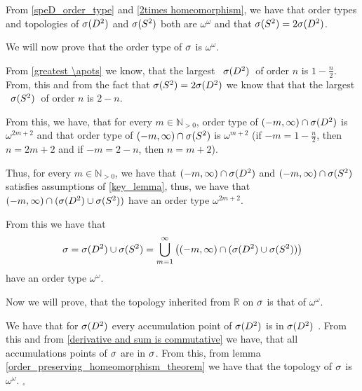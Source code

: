 From \ref{speD_order_type} and \ref{2times homeomorphism}, we have that order types and 
topologies of ${{\sigma}(D^2)}$ and $\speS$ both are $\omega^\omega$ and that ${{\sigma}(S^2)} = 2{{\sigma}(D^2)}$.  

We will now prove that the order type of ${\sigma}$ is $\omega^\omega$.

From \ref{greatest \apots} we know, that the largest \apots\ ${{\sigma}(D^2)}$\ of order $n$ is 
$1-\frac{n}{2}$. From, this and from the fact that ${{\sigma}(S^2)} = 2{{\sigma}(D^2)}$ we know that 
that the largest \apots\ $\speS$\ of order $n$ is 
$2-n$. 

From this, we have, that for every $m \in \mathbb{N}_{>0}$, order type of 
$(-m, \infty) \cap {{\sigma}(D^2)}$ is $\omega^{2m+2}$ and that order type 
of $(-m, \infty) \cap {{\sigma}(S^2)}$ is $\omega^{m+2}$ (if $-m = 1-\frac{n}{2}$, then 
$n = 2m + 2$ and 
if $-m = 2 - n$, then $n = m + 2$). 

Thus, for every $m \in \mathbb{N}_{>0}$, we have that $(-m, \infty) \cap {{\sigma}(D^2)}$ and 
$(-m, \infty) \cap {{\sigma}(S^2)}$ satisfies assumptions of \ref{key_lemma}, thus, we have that 
$(-m, \infty) \cap ({{\sigma}(D^2)}\cup{{\sigma}(S^2)})$ have an order type $\omega^{2m+2}$. 

From this we have that 
\begin{equation}
{\sigma} = {{\sigma}(D^2)} \cup {{\sigma}(S^2)} = 
\bigcup\limits_{m=1}^\infty \left( (-m, \infty) \cap ({{\sigma}(D^2)}\cup{{\sigma}(S^2)}) \right)
\end{equation} 
have an order type $\omega^\omega$.

Now we will prove, that the topology inherited from $\mathbb{R}$ on ${\sigma}$ 
is that of $\omega^\omega$.

We have that for ${{\sigma}(D^2)}$ \rba{$\speS$} every accumulation point of 
${{\sigma}(D^2)}$ \rba{$\speS$} is in ${{\sigma}(D^2)}$ \rba{$\speS$}. From this and from 
\ref{derivative and sum is commutative} we have, that all accumulations points of ${\sigma}$ 
are in ${\sigma}$. From this, from lemma \ref{order_preserving_homeomorphism_theorem} we have 
that the topology of ${\sigma}$ is $\omega^\omega$. $_\square$ 




